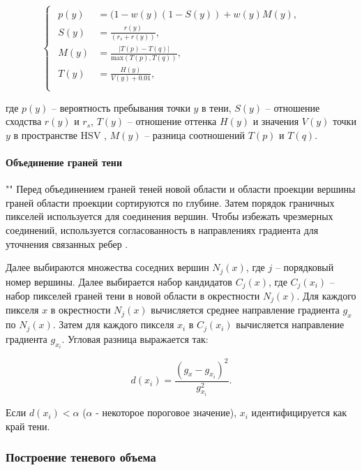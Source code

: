 \begin{equation}
	\begin{cases}
		\begin{aligned}
			p(y) &= (1 - w(y)(1 - S(y)) + w(y)M(y), &&\\
			S(y) &= \frac{r(y)}{(r_s + r(y))}, &&\\
			M(y) &= \frac{|T(p) - T(q)|}{\text{max}(T(p), T(q))}, &&\\
			T(y) &= \frac{H(y)}{V(y) + 0.01}, &&\\
		\end{aligned}
	\end{cases}
\end{equation}

где $p(y)$ -- вероятность пребывания точки $y$ в тени, $S(y)$ -- отношение сходства $r(y)$ и $r_s$, $T(y)$ -- отношение оттенка $H(y)$ и значения $V(y)$ точки $y$ в пространстве HSV \cite{cheng2001color}, $M(y)$ -- разница соотношений $T(p)$ и $T(q)$.

\paragraph*{Объединение граней тени} 
""\newline\indent
Перед объединением граней теней новой области и области проекции вершины граней области проекции сортируются по глубине. Затем порядок граничных пикселей используется для соединения вершин. Чтобы избежать чрезмерных соединений, используется согласованность в направлениях градиента для уточнения связанных ребер \cite{wei2019simulating}.

Далее выбираются множества соседних вершин $N_j(x)$, где $j$ -- порядковый номер вершины. Далее выбирается набор кандидатов $C_j(x)$, где $C_j(x_i)$ -- набор пикселей граней тени в новой области в окрестности $N_j(x)$. Для каждого пикселя $x$ в окрестности $N_j(x)$ вычисляется среднее направление градиента $g_x$ по $N_j(x)$. Затем для каждого пикселя $x_i$ в $C_j(x_i)$ вычисляется направление градиента $g_{x_i}$. Угловая разница выражается так:

\begin{equation}
	d(x_i) = \frac{(g_x - g_{x_i}) ^ 2}{g_{x_i} ^ 2}.
\end{equation}

Если $d(x_i) < \alpha$ ($\alpha$ - некоторое пороговое значение), $x_i$ идентифицируется как край тени.

\subsubsection*{Построение теневого объема}

